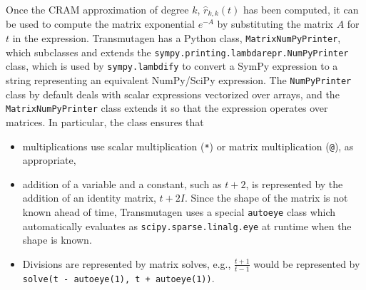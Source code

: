 Once the CRAM approximation of degree $k$, $\hat{r}_{k, k}(t)$ has been
computed, it can be used to compute the matrix exponential $e^{-A}$ by
substituting the matrix $A$ for $t$ in the expression. Transmutagen has a
Python class, \texttt{MatrixNumPyPrinter}, which subclasses and extends the
\texttt{sympy.printing.lambdarepr.NumPyPrinter} class, which is used by
\texttt{sympy.lambdify} to convert a SymPy expression to a string representing
an equivalent NumPy/SciPy expression. The \texttt{NumPyPrinter} class by
default deals with scalar expressions vectorized over arrays, and the
\texttt{MatrixNumPyPrinter} class extends it so that the expression operates
over matrices. In particular, the class ensures that

\begin{itemize}
\item multiplications use scalar multiplication (\texttt{*}) or
  matrix multiplication (\texttt{@}), as appropriate,
\item addition of a variable and a constant, such as $t + 2$, is represented
  by the addition of an identity matrix, $t + 2I$. Since the shape of the
  matrix is not known ahead of time, Transmutagen uses a special
  \texttt{autoeye} class which automatically evaluates as \texttt{scipy.sparse.linalg.eye} at runtime when the shape is known.
\item Divisions are represented by matrix solves, e.g., $\frac{t + 1}{t - 1}$
  would be represented by \texttt{solve(t - autoeye(1), t + autoeye(1))}.
\end{itemize}

